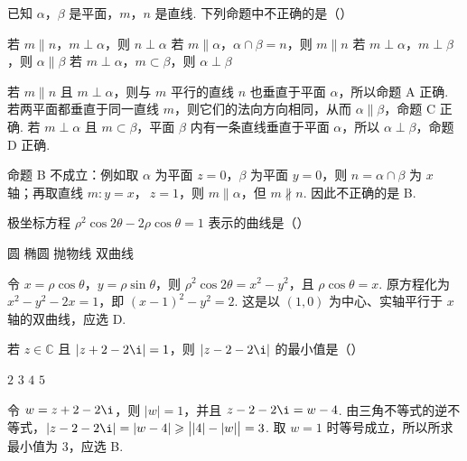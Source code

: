 \begin{problem}
已知 \(\alpha\)，\(\beta\) 是平面，\(m\)，\(n\) 是直线. 下列命题中不正确的是（\quad）

\choices
    {若 \(m\parallel n\)，\(m\perp\alpha\)，则 \(n\perp\alpha\)}
    {若 \(m\parallel\alpha\)，\(\alpha\cap\beta=n\)，则 \(m\parallel n\)}
    {若 \(m\perp\alpha\)，\(m\perp\beta\)，则 \(\alpha\parallel\beta\)}
    {若 \(m\perp\alpha\)，\(m\subset\beta\)，则 \(\alpha\perp\beta\)}

\begin{solution}
若 \(m\parallel n\) 且 \(m\perp\alpha\)，则与 \(m\) 平行的直线 \(n\) 也垂直于平面 \(\alpha\)，所以命题 A 正确. 若两平面都垂直于同一直线 \(m\)，则它们的法向方向相同，从而 \(\alpha\parallel\beta\)，命题 C 正确. 若 \(m\perp\alpha\) 且 \(m\subset\beta\)，平面 \(\beta\) 内有一条直线垂直于平面 \(\alpha\)，所以 \(\alpha\perp\beta\)，命题 D 正确.

命题 B 不成立：例如取 \(\alpha\) 为平面 \(z=0\)，\(\beta\) 为平面 \(y=0\)，则 \(n=\alpha\cap\beta\) 为 \(x\) 轴；再取直线 \(m\colon y=x\)，\(\ z=1\)，则 \(m\parallel\alpha\)，但 \(m\not\parallel n\). 因此不正确的是 B.
\end{solution}
\end{problem}

\begin{problem}
极坐标方程 \(\rho^2\cos 2\theta-2\rho\cos\theta=1\) 表示的曲线是（\quad）

\choices
    {圆}
    {椭圆}
    {抛物线}
    {双曲线}

\begin{solution}
令 \(x=\rho\cos\theta\)，\(y=\rho\sin\theta\)，则 \(\rho^2\cos2\theta=x^2-y^2\)，且 \(\rho\cos\theta=x\). 原方程化为 \(x^2-y^2-2x=1\)，即 \((x-1)^2-y^2=2\). 这是以 \((1,0)\) 为中心、实轴平行于 \(x\) 轴的双曲线，应选 D.
\end{solution}
\end{problem}

\begin{problem}
若 \(z\in\mathbb{C}\) 且 \(|z+2-2\i|=1\)，则 \(|z-2-2\i|\) 的最小值是（\quad）

\choices
    {\(2\)}
    {\(3\)}
    {\(4\)}
    {\(5\)}

\begin{solution}
令 \(w=z+2-2\i\)，则 \(\lvert w\rvert=1\)，并且 \(z-2-2\i=w-4\). 由三角不等式的逆不等式，\(\lvert z-2-2\i\rvert=\lvert w-4\rvert\geqslant\bigl|\lvert4\rvert-\lvert w\rvert\bigr|=3\). 取 \(w=1\) 时等号成立，所以所求最小值为 \(3\)，应选 B.
\end{solution}
\end{problem}

